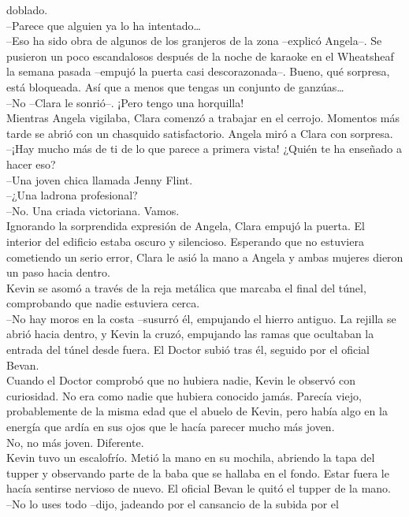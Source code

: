 doblado.\\
--Parece que alguien ya lo ha intentado\ldots{}\\
--Eso ha sido obra de algunos de los granjeros de la zona --explicó
Angela--. Se pusieron un poco escandalosos después de la noche de
karaoke en el Wheatsheaf la semana pasada --empujó la puerta casi
descorazonada--. Bueno, qué sorpresa, está bloqueada. Así que a menos
que tengas un conjunto de ganzúas\ldots{}\\
--No --Clara le sonrió--. ¡Pero tengo una horquilla!\\
Mientras Angela vigilaba, Clara comenzó a trabajar en el cerrojo.
Momentos más tarde se abrió con un chasquido satisfactorio. Angela miró
a Clara con sorpresa.\\
--¡Hay mucho más de ti de lo que parece a primera vista! ¿Quién te ha
enseñado a hacer eso?\\
--Una joven chica llamada Jenny Flint.\\
--¿Una ladrona profesional?\\
--No. Una criada victoriana. Vamos.\\
Ignorando la sorprendida expresión de Angela, Clara empujó la puerta. El
interior del edificio estaba oscuro y silencioso. Esperando que no
estuviera cometiendo un serio error, Clara le asió la mano a Angela y
ambas mujeres dieron un paso hacia dentro.\\[2\baselineskip]Kevin se
asomó a través de la reja metálica que marcaba el final del túnel,
comprobando que nadie estuviera cerca.\\
--No hay moros en la costa --susurró él, empujando el hierro antiguo. La
rejilla se abrió hacia dentro, y Kevin la cruzó, empujando las ramas que
ocultaban la entrada del túnel desde fuera. El Doctor subió tras él,
seguido por el oficial Bevan.\\
Cuando el Doctor comprobó que no hubiera nadie, Kevin le observó con
curiosidad. No era como nadie que hubiera conocido jamás. Parecía viejo,
probablemente de la misma edad que el abuelo de Kevin, pero había algo
en la energía que ardía en sus ojos que le hacía parecer mucho más
joven.\\
No, no más joven. Diferente.\\
Kevin tuvo un escalofrío. Metió la mano en su mochila, abriendo la tapa
del tupper y observando parte de la baba que se hallaba en el fondo.
Estar fuera le hacía sentirse nervioso de nuevo. El oficial Bevan le
quitó el tupper de la mano.\\
--No lo uses todo --dijo, jadeando por el cansancio de la subida por el
